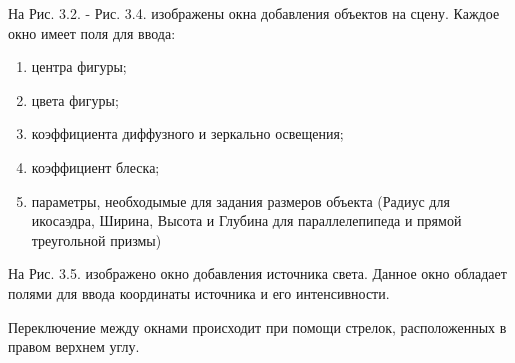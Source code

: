 \documentclass[12pt]{report}
\begin{document}
	
	На Рис. 3.2. - Рис. 3.4. изображены окна добавления объектов на сцену.
	Каждое окно имеет поля для ввода:
	\begin{enumerate}
		\item центра фигуры;
		\item цвета фигуры;
		\item коэффициента диффузного и зеркально освещения;
		\item коэффициент блеска;
		\item параметры, необходымые для задания размеров объекта (Радиус для икосаэдра, Ширина, Высота и Глубина для параллелепипеда и прямой треугольной призмы)
	\end{enumerate}

	На Рис. 3.5. изображено окно добавления источника света. Данное окно обладает полями для ввода координаты источника и его интенсивности.
	
	Переключение между окнами происходит при помощи стрелок, расположенных в правом верхнем углу.
	
	~\\
	
\end{document}
